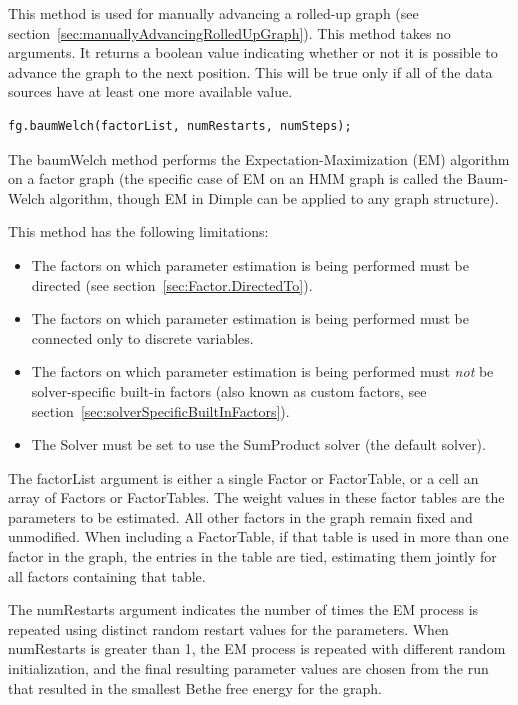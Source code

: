 
This method is used for manually advancing a rolled-up graph (see section~\ref{sec:manuallyAdvancingRolledUpGraph}).  This method takes no arguments.  It returns a boolean value indicating whether or not it is possible to advance the graph to the next position.  This will be true only if all of the data sources have at least one more available value.

\label{sec:FactorGraph.BaumWelch}

\begin{lstlisting}
fg.baumWelch(factorList, numRestarts, numSteps);
\end{lstlisting}

The baumWelch method performs the Expectation-Maximization (EM) algorithm on a factor graph (the specific case of EM on an HMM graph is called the Baum-Welch algorithm, though EM in Dimple can be applied to any graph structure).

This method has the following limitations:

\begin{itemize}
\item The factors on which parameter estimation is being performed must be directed (see section~\ref{sec:Factor.DirectedTo}).
\item The factors on which parameter estimation is being performed must be connected only to discrete variables.
\item The factors on which parameter estimation is being performed must \emph{not} be solver-specific built-in factors (also known as custom factors, see section~\ref{sec:solverSpecificBuiltInFactors}).
\item The Solver must be set to use the SumProduct solver (the default solver).
\end{itemize}

The factorList argument is either a single Factor or FactorTable, or \ifmatlab a cell \fi \ifjava an \fi array of Factors or FactorTables.  The weight values in these factor tables are the parameters to be estimated.  All other factors in the graph remain fixed and unmodified.  When including a FactorTable, if that table is used in more than one factor in the graph, the entries in the table are tied, estimating them jointly for all factors containing that table.

The numRestarts argument indicates the number of times the EM process is repeated using distinct random restart values for the parameters.  When numRestarts is greater than 1, the EM process is repeated with different random initialization, and the final resulting parameter values are chosen from the run that resulted in the smallest Bethe free energy for the graph.


